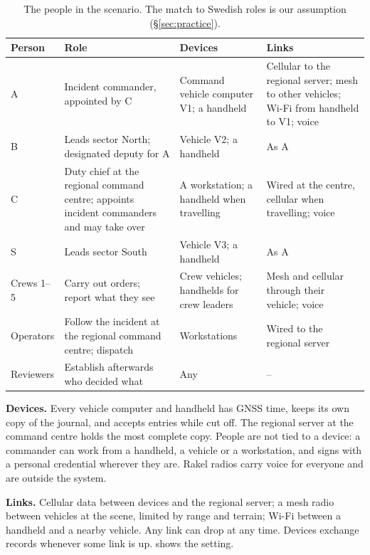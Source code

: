\documentclass[11pt,a4paper]{article}
\begin{document}
\begin{table}[htbp]
\centering
\caption{The people in the scenario. The match to Swedish roles is our assumption
(\S\ref{sec:practice}).}
\label{tab:people}
\small
\begin{tabularx}{\linewidth}{@{}P{2.2cm}LP{3.6cm}P{3.9cm}@{}}
\toprule
\textbf{Person} & \textbf{Role} & \textbf{Devices} & \textbf{Links} \\
\midrule
A & Incident commander, appointed by C & Command vehicle computer V1; a handheld &
  Cellular to the regional server; mesh to other vehicles; Wi-Fi from handheld to V1; voice \\
B & Leads sector North; designated deputy for A & Vehicle V2; a handheld & As A \\
C & Duty chief at the regional command centre; appoints incident commanders and may take
  over & A workstation; a handheld when travelling & Wired at the centre, cellular when
  travelling; voice \\
S & Leads sector South & Vehicle V3; a handheld & As A \\
Crews 1--5 & Carry out orders; report what they see & Crew vehicles; handhelds for crew
  leaders & Mesh and cellular through their vehicle; voice \\
Operators & Follow the incident at the regional command centre; dispatch & Workstations &
  Wired to the regional server \\
Reviewers & Establish afterwards who decided what & Any & -- \\
\bottomrule
\end{tabularx}
\end{table}

\textbf{Devices.} Every vehicle computer and handheld has GNSS time, keeps its own copy of
the journal, and accepts entries while cut off. The regional server at the command centre
holds the most complete copy. People are not tied to a device: a commander can work from
a handheld, a vehicle or a workstation, and signs with a personal credential wherever they
are. Rakel radios carry voice for everyone and are outside the system.

\textbf{Links.} Cellular data between devices and the regional server; a mesh radio between
vehicles at the scene, limited by range and terrain; Wi-Fi between a handheld and a
nearby vehicle. Any link can drop at any time. Devices exchange records whenever some link
is up.  shows the setting.
\end{document}
